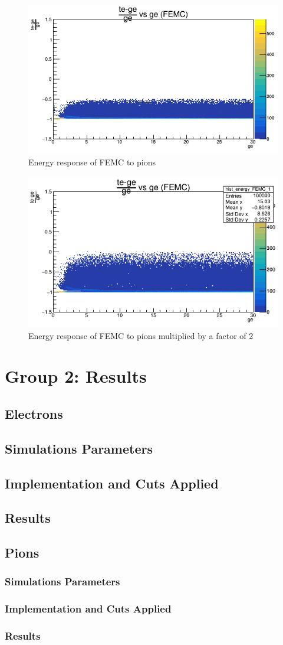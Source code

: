 \begin{figure}[H]
        \centering  
		\includegraphics[width=0.5\linewidth]{group1/FEMC.png}
		
		\caption{Energy response of FEMC to pions}
		\label{fig:g1_ch5_img6}
\end{figure}

\begin{figure}[H]
        \centering  
		\includegraphics[width=0.5\linewidth]{group1/FEMCx2.png}
		\caption{Energy response of FEMC to pions multiplied by a factor of 2}
		\label{fig:g1_ch5_img7}
\end{figure}


\section{Group 2: Results}
\subsection{Electrons}
\subsection{Simulations Parameters}
\subsection{Implementation and Cuts Applied}
\subsection{Results}


\subsection{Pions}
\subsubsection{Simulations Parameters}
\subsubsection{Implementation and Cuts Applied}
\subsubsection{Results}



